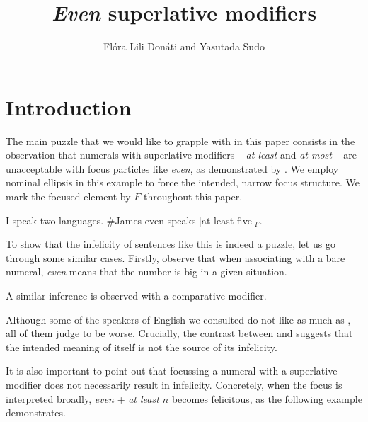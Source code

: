 \documentclass[output=paper]{langscibook}
\author{Flóra Lili Donáti\affiliation{Université Paris 8 -- SFL} and
Yasutada Sudo\affiliation{University College London}}
\title[\textup{Even} superlative modifiers]{\textit{Even} superlative modifiers}
\begin{document}
\maketitle



\section{Introduction}

The main puzzle that we would like to grapple with in this paper consists in the observation that numerals with superlative modifiers -- \textit{at least} and \textit{at most} -- are unacceptable with focus particles like \textit{even}, as demonstrated by . We employ nominal ellipsis in this example to force the intended, narrow focus structure. We mark the focused element by $F$ throughout this paper.

    \ea
    I speak two languages.
    \#James even speaks [at least five]$_F$.\label{don-sud:langs}
    \z

\noindent To show that the infelicity of sentences like this is indeed a puzzle, let us go through some similar cases. Firstly, observe that when associating with a bare numeral, \textit{even} means that the number is big in a given situation. 

    \z
  
\noindent A similar inference is observed with a comparative modifier.

    \z
   
\noindent Although some of the speakers of English we consulted do not like  as much as , all of them judge  to be worse. Crucially, the contrast between  and  suggests that the intended meaning of  itself is not the source of its infelicity.

    It is also important to point out that focussing a numeral with a superlative modifier does not necessarily result in infelicity. Concretely, when the focus is interpreted broadly, \textit{even} + \textit{at least $n$} becomes felicitous, as the following example demonstrates.
\end{document}
